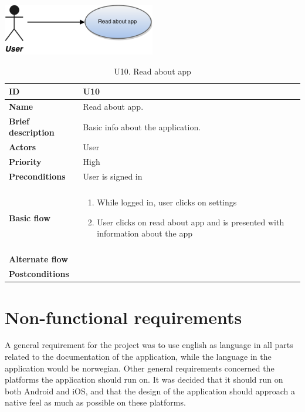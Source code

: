 \begin{table}[htp]
	\includegraphics[width=0.5\textwidth]{fig/U10}
	\centering
	\caption{U10. Read about app}
	\begin{tabular}[b]{|l | l|}\hline
		\textbf{ID} 				& U10									\\\hline
		\textbf{Name} 				& Read about app.						\\\hline
		\textbf{Brief description}	& Basic info about the application. 	\\\hline
		\textbf{Actors} 			& User									\\\hline
		\textbf{Priority}			& High									\\\hline
		\textbf{Preconditions}		& User is signed in						\\\hline&\\[-2ex]
		\textbf{Basic flow}			& \begin{minipage}{5in}
			\begin{enumerate}[noitemsep]
				\item While logged in, user clicks on settings
				\item User clicks on read about app and is presented with information about the app
			\end{enumerate}						
		\end{minipage}						\\\hline&\\[-2ex]
		\textbf{Alternate flow}		& \begin{minipage}{5in}
		\end{minipage}							\\\hline
		\textbf{Postconditions}		& \\\hline
	\end{tabular}
\end{table}

\section{Non-functional requirements}
\label{sec:non-functional_requirements}

A general requirement for the project was to use english as language in all parts related to the documentation of the application, while the language in the application would be norwegian. Other general requirements concerned the platforms the application should run on. It was decided that it should run on both Android and iOS, and that the design of the application should approach a native feel as much as possible on these platforms.\newline

